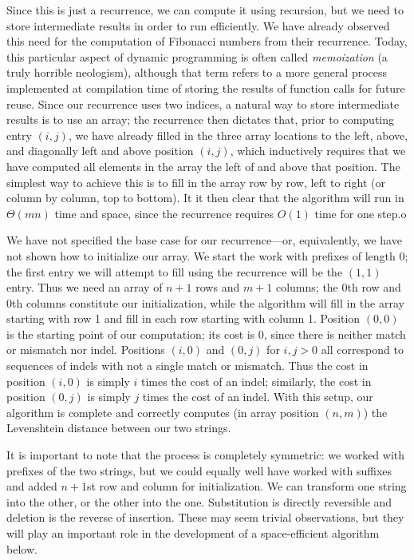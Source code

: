 \documentclass[11pt]{article}
\begin{document}
Since this is just a recurrence, we can compute it using recursion, but
we need to store intermediate results in order to run efficiently.
We have already observed this need for the computation of Fibonacci
numbers from their recurrence.  Today, this particular aspect of dynamic
programming is often called \emph{memoization} (a truly horrible neologism),
although that term refers to a more general process implemented at compilation
time of storing the results of function calls for future reuse.
Since our recurrence uses two indices, a natural way to store intermediate
results is to use an array; the recurrence then dictates that, prior to
computing entry $(i,j)$, we have already filled in the three array locations
to the left, above, and diagonally left and above position $(i,j)$, which
inductively requires that we have computed all elements in the array the left
of and above that position.   The simplest way to achieve this is to fill
in the array row by row, left to right (or column by column, top to bottom).
It it then clear that the algorithm will run in $\Theta(mn)$ time and space,
since the recurrence requires $O(1)$ time for one step.o

We have not specified the base case for our recurrence---or, equivalently,
we have not shown how to initialize our array.  We start the work with
prefixes of length 0; the first entry we will attempt to fill using the
recurrence will be the $(1,1)$ entry.  Thus we need an array of $n+1$
rows and $m+1$ columns; the 0th row and 0th columns constitute our
initialization, while the algorithm will fill in the array starting with row 1
and fill in each row starting with column 1.   Position $(0,0)$ is the
starting point of our computation; its cost is 0, since there is neither
match or mismatch nor indel.   Positions $(i,0)$ and $(0,j)$ for $i,j >0$
all correspond to sequences of indels with not a single match or mismatch.
Thus the cost in position $(i,0)$ is simply $i$ times the cost of an indel;
similarly, the cost in position $(0,j)$ is simply $j$ times the cost of
an indel.  With this setup, our algorithm is complete and correctly
computes (in array position $(n,m)$) the Levenshtein distance between
our two strings.

It is important to note that the process is completely symmetric: we worked
with prefixes of the two strings, but we could equally well have worked with
suffixes and added $n+1$st row and column for initialization.  We can
transform one string into the other, or the other into the one.  Substitution
is directly reversible and deletion is the reverse of insertion.  These
may seem trivial observations, but they will play an important role in
the development of a space-efficient algorithm below.
\end{document}

